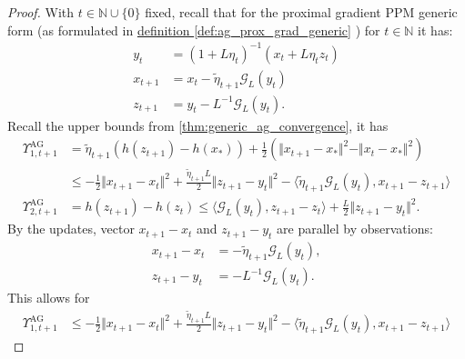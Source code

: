 \documentclass[12pt]{article}
\begin{document}
    \begin{proof}
        With $t \in \mathbb N \cup \{0\}$ fixed, 
        recall that for the proximal gradient PPM generic form 
        (as formulated in 
        \hyperref[def:ag_prox_grad_generic]{definition \ref*{def:ag_prox_grad_generic}}
        ) for $t\in \mathbb N$ it has: 
        \begin{align*}
            y_t &= (1 + L\eta_t)^{-1}(x_t + L\eta_t z_t)
            \\
            x_{t + 1} &= x_t - \tilde \eta_{t + 1} \mathcal G_L(y_t)
            \\
            z_{t + 1} &= y_t - L^{-1}\mathcal G_L(y_t). 
        \end{align*}
        Recall the upper bounds from 
        \ref*{thm:generic_ag_convergence}, 
        it has 
        \begin{align*}
            \Upsilon_{1, t + 1}^\text{AG}
            &= 
            \tilde\eta_{t + 1} (h(z_{t + 1}) - h(x_*)) + 
            \frac{1}{2} (
                \Vert x_{t + 1} - x_*\Vert^2
                - 
                \Vert x_t - x_*\Vert^2
            )
            \\
            &\le 
            - \frac{1}{2}\Vert x_{t + 1} - x_t\Vert^2 
            + \frac{\tilde\eta_{t + 1}L}{2}\Vert z_{t + 1} - y_t\Vert^2
            - \langle 
                \tilde\eta_{t + 1} \mathcal G_L(y_t), 
                x_{t + 1} - z_{t + 1}
            \rangle
            \\
            \Upsilon_{2, t + 1}^\text{AG}
            &= 
            h(z_{t + 1}) - h(z_t) 
            \le 
            \langle \mathcal G_L(y_t), z_{t + 1} - z_t\rangle + 
            \frac{L}{2}\Vert z_{t + 1} - y_t\Vert^2. 
        \end{align*}
        By the updates, vector $x_{t + 1} - x_t$ and $z_{t + 1} - y_t$ are parallel by observations: 
        \begin{align*}
            x_{t + 1} - x_t &= -\tilde\eta_{t + 1}\mathcal G_L(y_t), 
            \\
            z_{t + 1} - y_t &= -L^{-1}\mathcal G_L(y_t). 
        \end{align*}
        This allows for 
        \begin{align*}
            \Upsilon_{1, t + 1}^{\text{AG}} 
            &\le 
            - \frac{1}{2}\Vert x_{t + 1} - x_t\Vert^2 + 
            \frac{\tilde\eta_{t + 1}L}{2}\Vert z_{t + 1} - y_t\Vert^2 
            - 
            \langle \tilde\eta_{t + 1}\mathcal G_L (y_t), x_{t + 1} - z_{t + 1} \rangle

\end{align*}
\end{proof}
\end{document}
